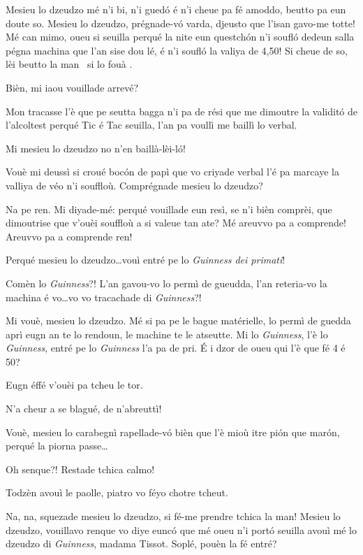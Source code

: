 \begin{drama}
\Cienspeaks Mesieu lo dzeudzo mé n’i bi, n’i guedó é n’i cheue pa fé amoddo, beutto pa eun doute so. Mesieu lo dzeudzo, prégnade-v\'o varda, djeusto que l'isan gavo-me totte! Mé can mimo, oueu si seuilla perqué la nite eun questchón n’i soufló dedeun salla pégna machina que l’an sise dou lé, é n’i soufló la valiya de 4,50! Si cheue de so, lèi beutto la man \man\ si lo fouà \foua.

\DzeudzoSenliquerspeaks Bièn, mi iaou vouillade arrevé?

\Cienspeaks Mon tracasse l’è que pe seutta bagga n’i pa de rési que me dimoutre la validitó de l'alcoltest perqué Tic é Tac seuilla, l’an pa voullì me baillì lo verbal.

\Ticspeaks Mi mesieu lo dzeudzo no n’en baillà-lèi-l\'o!

\Cienspeaks Vouè mi deussì si croué bocón de papì que vo criyade verbal l'é pa marcaye la valliya de véo n’i souffloù. Comprégnade mesieu lo dzeudzo?

\DzeudzoSenliquerspeaks Na pe ren. Mi diyade-mé: perqué vouillade eun resì, se n’i bièn comprèi, que dimoutrise que v'ouèi souffloù \soffiare a si valeue tan ate? Mé areuvvo pa a comprende! Areuvvo pa a comprende ren!

\Cienspeaks Perqué mesieu lo dzeudzo\ldots vouì entré pe lo  \textit{Guinness dei primati}!

\DzeudzoSenliquerspeaks Comèn lo \textit{Guinness}?!  L'an gavou-vo lo permì de gueudda, l'an reteria-vo la machina é vo\ldots vo vo tracachade di \textit{Guinness}?!

\Cienspeaks Mi vouè, mesieu lo dzeudzo. Mé si pa pe le bague matérielle, lo permì de guedda aprì eugn an te lo rendoun, le machine te le atseutte. Mi lo \textit{Guinness}, l'è lo \textit{Guinness}, entré pe lo \textit{Guinness} l'a pa de pri. É i dzor de oueu qui l'è que fé 4 é 50?

\DzeudzoSenliquerspeaks Eugn éffé v'ouèi pa tcheu le tor.

\Ticspeaks N'a cheur a se blagué, de n’abreuttì!

\Cienspeaks Vouè, mesieu lo carabegnì rapellade-v\'o bièn que l'è mioù itre pi\'on que marón, perqué la piorna passe\ldots

\Ticspeaks {} Oh senque?! Restade tchica calmo!

\DzeudzoSenliquerspeaks {} Todzèn avouì le paolle, piatro vo féyo chotre tcheut.

\Cienspeaks Na, na, squezade mesieu lo dzeudzo, si fé-me prendre tchica la man! Mesieu lo dzeudzo, vouillavo renque vo diye eunc\'o que mé oueu n’i portó seuilla avouì mé lo dzeudzo di \textit{Guinness}, madama Tissot. Soplé, pouèn la fé entré?


\end{drama}
